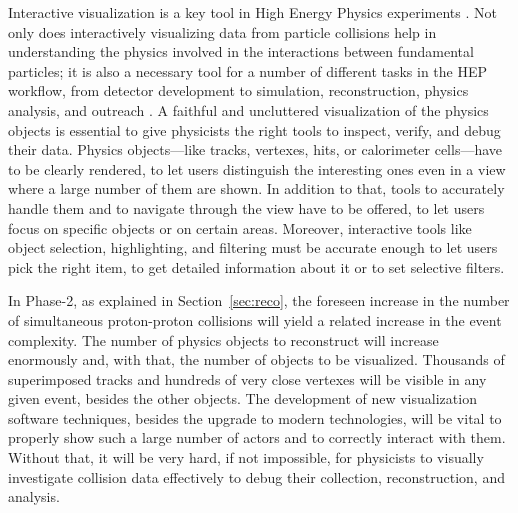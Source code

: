 

Interactive visualization is a key tool in High Energy Physics experiments \cite{ref:atlas-event-visualization}. Not only does interactively visualizing data from particle collisions help in understanding the physics involved in the interactions between fundamental particles; it is also a necessary tool for a number of different tasks in the HEP workflow, from detector development to simulation, reconstruction, physics analysis, and outreach \cite{ref:atlas-public-ed}. %
A faithful and uncluttered visualization of the physics objects is essential %
to give physicists the right tools to inspect, verify, and debug their data. Physics objects---like tracks, vertexes, hits, or calorimeter cells---have to be clearly rendered, to let users distinguish the interesting ones even in a view where a large number of them are shown. In addition to that, tools to accurately handle them and to navigate through the view have to be offered, to let users focus on specific objects or on certain areas. 
Moreover, interactive tools like object selection, highlighting, and filtering must be accurate enough to let users pick the right item, to get detailed information about it or to set selective filters.

In Phase-2, as explained in Section~\ref{sec:reco}, the foreseen increase in the number of simultaneous proton-proton collisions will yield a related increase in the event complexity. The number of physics objects to reconstruct will increase enormously and, with that, the number of objects to be visualized. Thousands of superimposed tracks  and hundreds of very close vertexes will be visible in any given event, besides the other objects. The development of new visualization software  techniques, besides the upgrade to modern technologies, will be vital to properly show such a large number of actors and to correctly interact with them. Without that, it will be very hard, if not impossible, for physicists to visually investigate collision data effectively to debug their collection, reconstruction, and analysis.



